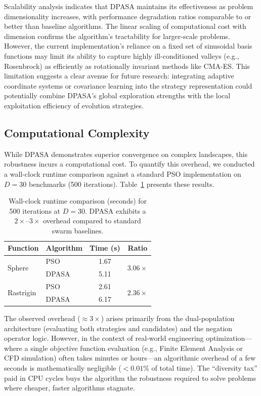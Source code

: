 \documentclass[11pt]{article}
\begin{document}
Scalability analysis indicates that DPASA maintains its effectiveness as problem dimensionality increases, with performance degradation ratios comparable to or better than baseline algorithms. The linear scaling of computational cost with dimension confirms the algorithm's tractability for larger-scale problems. However, the current implementation's reliance on a fixed set of sinusoidal basis functions may limit its ability to capture highly ill-conditioned valleys (e.g., Rosenbrock) as efficiently as rotationally invariant methods like CMA-ES. This limitation suggests a clear avenue for future research: integrating adaptive coordinate systems or covariance learning into the strategy representation could potentially combine DPASA's global exploration strengths with the local exploitation efficiency of evolution strategies.

\subsection{Computational Complexity}
\label{sec:computational_cost}

While DPASA demonstrates superior convergence on complex landscapes, this robustness incurs a computational cost. To quantify this overhead, we conducted a wall-clock runtime comparison against a standard PSO implementation on $D=30$ benchmarks (500 iterations). Table~\ref{tab:runtime_cost} presents these results.

\begin{table}[ht]
\centering
\caption{Wall-clock runtime comparison (seconds) for 500 iterations at $D=30$. DPASA exhibits a $2\times$--$3\times$ overhead compared to standard swarm baselines.}
\label{tab:runtime_cost}
\small
\begin{tabular}{@{}llcc@{}}
\toprule
\textbf{Function} & \textbf{Algorithm} & \textbf{Time (s)} & \textbf{Ratio} \\
\midrule
\multirow{2}{*}{Sphere} & PSO & 1.67 & \multirow{2}{*}{$3.06\times$} \\
 & DPASA & 5.11 & \\
\midrule
\multirow{2}{*}{Rastrigin} & PSO & 2.61 & \multirow{2}{*}{$2.36\times$} \\
 & DPASA & 6.17 & \\
\bottomrule
\end{tabular}
\end{table}

The observed overhead ($\approx 3\times$) arises primarily from the dual-population architecture (evaluating both strategies and candidates) and the negation operator logic. However, in the context of real-world engineering optimization---where a single objective function evaluation (e.g., Finite Element Analysis or CFD simulation) often takes minutes or hours---an algorithmic overhead of a few seconds is mathematically negligible ($< 0.01\%$ of total time). The ``diversity tax'' paid in CPU cycles buys the algorithm the robustness required to solve problems where cheaper, faster algorithms stagnate.
\end{document}
